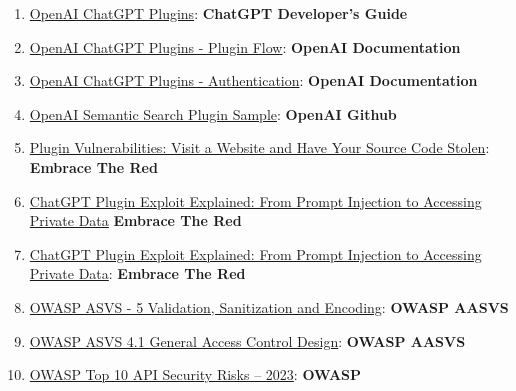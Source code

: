 \documentclass[
]{article}
\providecommand{\tightlist}{%
  \setlength{\itemsep}{0pt}\setlength{\parskip}{0pt}}
\begin{document}
\begin{enumerate}
\def\labelenumi{\arabic{enumi}.}
\tightlist
\item
  \href{https://platform.openai.com/docs/plugins/introduction}{OpenAI
  ChatGPT Plugins}: \textbf{ChatGPT Developer's Guide}
\item
  \href{https://platform.openai.com/docs/plugins/introduction/plugin-flow}{OpenAI
  ChatGPT Plugins - Plugin Flow}: \textbf{OpenAI Documentation}
\item
  \href{https://platform.openai.com/docs/plugins/authentication/service-level}{OpenAI
  ChatGPT Plugins - Authentication}: \textbf{OpenAI Documentation}
\item
  \href{https://github.com/openai/chatgpt-retrieval-plugin}{OpenAI
  Semantic Search Plugin Sample}: \textbf{OpenAI Github}
\item
  \href{https://embracethered.com/blog/posts/2023/chatgpt-plugin-vulns-chat-with-code/}{Plugin
  Vulnerabilities: Visit a Website and Have Your Source Code Stolen}:
  \textbf{Embrace The Red}
\item
  \href{https://embracethered.com/blog/posts/2023/chatgpt-cross-plugin-request-forgery-and-prompt-injection./}{ChatGPT
  Plugin Exploit Explained: From Prompt Injection to Accessing Private
  Data} \textbf{Embrace The Red}
\item
  \href{https://embracethered.com/blog/posts/2023/chatgpt-cross-plugin-request-forgery-and-prompt-injection./}{ChatGPT
  Plugin Exploit Explained: From Prompt Injection to Accessing Private
  Data}: \textbf{Embrace The Red}
\item
  \href{https://owasp-aasvs4.readthedocs.io/en/latest/V5.html\#validation-sanitization-and-encoding}{OWASP
  ASVS - 5 Validation, Sanitization and Encoding}: \textbf{OWASP AASVS}
\item
  \href{https://owasp-aasvs4.readthedocs.io/en/latest/V4.1.html\#general-access-control-design}{OWASP
  ASVS 4.1 General Access Control Design}: \textbf{OWASP AASVS}
\item
  \href{https://owasp.org/API-Security/editions/2023/en/0x11-t10/}{OWASP
  Top 10 API Security Risks -- 2023}: \textbf{OWASP}
\end{enumerate}
\end{document}
